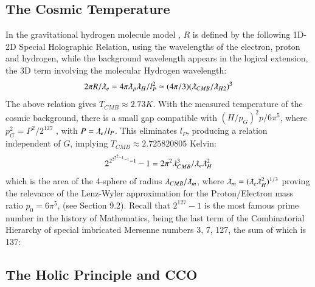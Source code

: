 \documentclass[twoside,draft]{article}
\begin{document}
\begin{sloppypar}
\subsection{The Cosmic Temperature}

In the gravitational hydrogen molecule model \cite{Sanchez1}, $R$ is defined by the following 1D-2D Special
Holographic Relation, using the wavelengths of the electron, proton and hydrogen, while the background wavelength appears in the logical extension, the 3D term involving the molecular Hydrogen wavelength:
\begin{equation}
2 \pi R/\lambdabar_{e} = 4 \pi \lambdabar_{p} \lambdabar_{H} /l_{P}^2 \simeq (4\pi/3)(\lambdabar_{CMB} /\lambdabar_{H2})^{3}
\end{equation}
The above relation gives $T_{CMB} \approx 2.73 K$. With the measured temperature of the cosmic
background, there is a small gap compatible with $(H/p_G)^2 p/6\pi^5 $, where $p_{G}^{2} = P^{2} /2^{127}$ , with $P = \lambdabar_{e} /l_{P}$. 
This eliminates $l_{P}$, producing a relation independent of $G$, implying $T_{CMB} \approx 2.725820805$ Kelvin:
$$2^{2^{{2^{2^2 - 1}-1}}-1}-1 = 2\pi^{2} \lambda_{CMB}^{3} /\lambdabar_{e} \lambdabar_{H}^2$$
which is the area of the 4-sphere of radius $\lambda_{CMB} / \lambdabar_{m}$, where $\lambdabar_{m} = (\lambdabar_{e} \lambdabar_{H}^2)^{1/3} $ proving the relevance of
the Lenz-Wyler approximation for the Proton/Electron mass ratio $p_0 = 6\pi^{5}$, (see Section 9.2). Recall
that $2^{127} - 1$ is the most famous prime number in the history of Mathematics, being the last term of
the Combinatorial Hierarchy \cite{Sanchez1} of special imbricated Mersenne numbers 3, 7, 127, the sum of which is 137:

\subsection{The Holic Principle and CCO}


\end{sloppypar}
\end{document}
